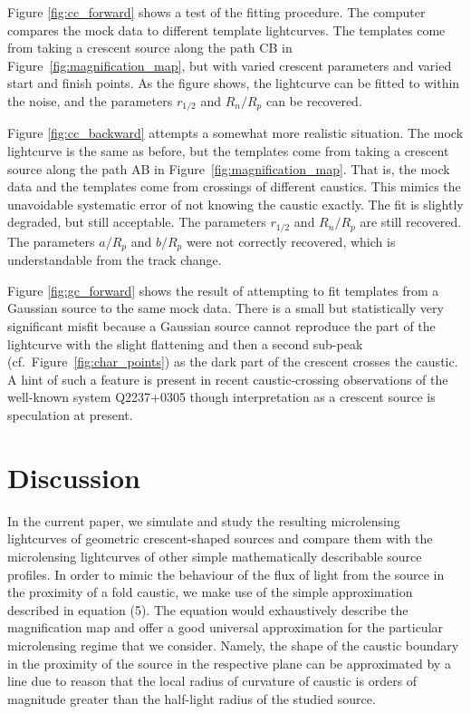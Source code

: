 \documentclass[usenatbib]{mn2e}
\begin{document}
Figure \ref{fig:cc_forward} shows a test of the fitting procedure.
The computer compares the mock data to different template
lightcurves. The templates come from taking a crescent source along
the path CB in Figure~\ref{fig:magnification_map}, but with varied
crescent parameters and varied start and finish points.  As the figure
shows, the lightcurve can be fitted to within the noise, and the
parameters $r_{1/2}$ and $R_n/R_p$ can be recovered.

Figure \ref{fig:cc_backward} attempts a somewhat more realistic
situation.  The mock lightcurve is the same as before, but the
templates come from taking a crescent source along the path AB in
Figure~\ref{fig:magnification_map}.  That is, the mock data and the
templates come from crossings of different caustics.  This mimics the
unavoidable systematic error of not knowing the caustic exactly.  The
fit is slightly degraded, but still acceptable.  The parameters
$r_{1/2}$ and $R_n/R_p$ are still recovered.  The parameters $a/R_p$
and $b/R_p$ were not correctly recovered, which is understandable from
the track change.

Figure \ref{fig:gc_forward} shows the result of attempting to fit
templates from a Gaussian source to the same mock data.  There is a
small but statistically very significant misfit because a Gaussian
source cannot reproduce the part of the lightcurve with the slight
flattening and then a second sub-peak
(cf.~Figure~\ref{fig:char_points}) as the dark part of the crescent
crosses the caustic.  A hint of such a feature is present in recent
caustic-crossing observations of the well-known system Q2237+0305
\citep[see Figure~3 in][]{2015ApJ...814L..26M} though interpretation
as a crescent source is speculation at present.

\section{Discussion}\label{sec:discussion}

In the current paper, we simulate and study the resulting microlensing lightcurves of geometric crescent-shaped sources 
and compare them with the microlensing lightcurves of other simple mathematically describable source profiles. 
In order to mimic the behaviour of the flux of light from the source in the proximity of a fold caustic, 
we make use of the simple approximation described in equation (5). 
The equation would exhaustively describe the magnification map and offer a good universal approximation for the 
particular microlensing regime that we consider. 
Namely, the shape of the caustic boundary in the proximity of the source in the respective plane can be approximated by
 a line due to reason that the local radius of curvature of caustic is orders of magnitude greater than the half-light
 radius of the studied source. 
\end{document}

